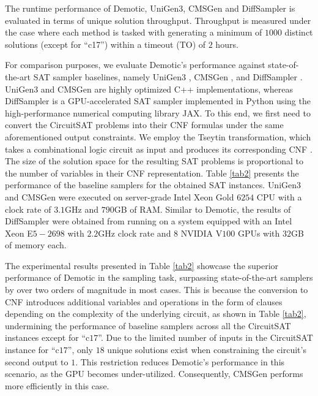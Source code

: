 \begin{table*}[t]
    \centering
    \caption{The runtime performance of {\sc Demotic}, {\sc UniGen3}, {\sc CMSGen} and {\sc DiffSampler} is evaluated in terms of unique solution throughput. Throughput is measured under the case where each method is tasked with generating a minimum of $1000$ distinct solutions (except for ``c17'') within a timeout (TO) of $2$ hours.}
    \vspace{-0.25cm}
    
    \label{tab2}
    \vspace{-0.25cm}
\end{table*}

For comparison purposes, we evaluate {\sc Demotic}'s performance against state-of-the-art SAT sampler baselines, namely {\sc UniGen3} \cite{Soos2020unigen3}, {\sc CMSGen} \cite{Golia2021cmsgen}, and {\sc DiffSampler} \cite{Ardakani2024diffsampler}. {\sc UniGen3} and {\sc CMSGen} are highly optimized C++ implementations, whereas {\sc DiffSampler} is a GPU-accelerated SAT sampler implemented in Python using the high-performance numerical computing library JAX. To this end, we first need to convert the CircuitSAT problems into their CNF formulas under the same aforementioned output constraints. We employ the Tseytin transformation, which takes a combinational logic circuit as input and produces its corresponding CNF \cite{tseitin1983complexity}. The size of the solution space for the resulting SAT problems is proportional to the number of variables in their CNF representation. Table \ref{tab2} presents the performance of the baseline samplers for the obtained SAT instances. {\sc UniGen3} and {\sc CMSGen} were executed on server-grade Intel Xeon Gold $6254$ CPU with a clock rate of $3.1$GHz and $790$GB of RAM. Similar to {\sc Demotic}, the results of {\sc DiffSampler} were obtained from running on a system equipped with an Intel Xeon E$5-2698$ with $2.2$GHz clock rate and $8$ NVIDIA V$100$ GPUs with $32$GB of memory each.




%     


The experimental results presented in Table \ref{tab2} showcase the superior performance of {\sc Demotic} in the sampling task, surpassing state-of-the-art samplers by over two orders of magnitude in most cases. This is because the conversion to CNF introduces additional variables and operations in the form of clauses depending on the complexity of the underlying circuit, as shown in Table \ref{tab2}, undermining the performance of baseline samplers across all the CircuitSAT instances except for ``c$17$''. Due to the limited number of inputs in the CircuitSAT instance for ``c$17$'', only $18$ unique solutions exist when constraining the circuit's second output to $1$. This restriction reduces {\sc Demotic}'s performance in this scenario, as the GPU becomes under-utilized. Consequently, {\sc CMSGen} performs more efficiently in this case.



